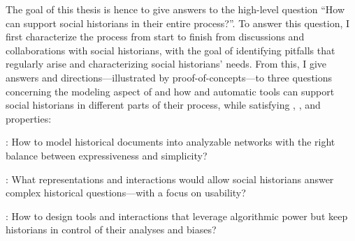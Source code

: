 The goal of this thesis is hence to give answers to the high-level question ``How can \va support social historians in their entire \hsna process?''.
To answer this question, I first characterize the \hsna process from start to finish from discussions and collaborations with social historians, with the goal of identifying pitfalls that regularly arise and characterizing social historians' needs.
From this, I give answers and directions---illustrated by proof-of-concepts---to three questions concerning the modeling aspect of \hsna and how \va and automatic tools can support social historians in different parts of their process, while satisfying \traceability, \reality, and \simplicity properties:

\begin{description}
    \item \qone:  How to model historical documents into analyzable networks with the right balance between expressiveness and simplicity?
    \item \qtwo:  What representations and interactions would allow social historians answer complex historical questions---with a focus on usability?
    \item \qthree: How to design \va tools and interactions that leverage algorithmic power but keep historians in control of their analyses and biases?
\end{description}

